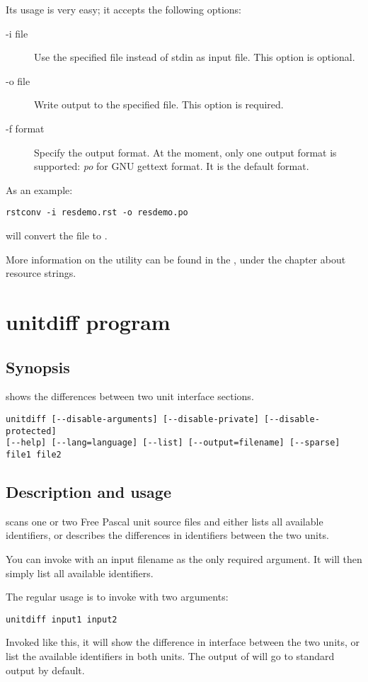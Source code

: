 Its usage is very easy; it accepts the following options:
\begin{description}
\item[-i file] Use the specified file instead of stdin as input file. This
option is optional.
\item[-o file] Write output to the specified file. This option is required.
\item[-f format] Specify the output format. At the moment, only one output
format is supported: {\em po} for GNU gettext  format.
It is the default format.
\end{description}
As an example:
\begin{verbatim}
rstconv -i resdemo.rst -o resdemo.po
\end{verbatim}
will convert the  file to .

More information on the  utility can be found in the \progref,
under the chapter about resource strings.

\section{unitdiff program}

\subsection{Synopsis}
 shows the differences between two unit interface sections. 
\begin{verbatim}
unitdiff [--disable-arguments] [--disable-private] [--disable-protected] 
[--help] [--lang=language] [--list] [--output=filename] [--sparse] 
file1 file2
\end{verbatim}

\subsection{Description and usage}

 scans one or two Free Pascal unit source files and either lists all
available identifiers, or describes the differences in identifiers
between the two units.

You can invoke  with an input filename as the only required
argument. It will then simply list all available identifiers.

The regular usage is to invoke  with two arguments:
\begin{verbatim}
unitdiff input1 input2
\end{verbatim}
Invoked like this, it will show the difference in interface between the two
units, or list the available identifiers in both units. The output of 
 will go to standard output by default.

